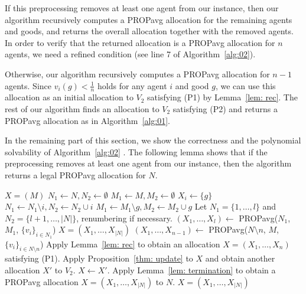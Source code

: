 \documentclass[11pt]{article}
\newcommand{\PROPavg}{\textsf{PROPavg}\xspace}
\begin{document}
If this preprocessing removes at least one agent from our instance, then our algorithm recursively computes a \PROPavg allocation for the remaining agents and goods, and returns the overall allocation together with the removed agents.
In order to verify that the returned allocation is a \PROPavg allocation for $n$ agents, we need a refined condition (see line 7 of Algorithm~\ref{alg:02}).

Otherwise, our algorithm recursively computes a \PROPavg allocation for $n-1$ agents.
Since $v_i(g)< \frac{1}{n}$ holds for any agent $i$ and good $g$,  
we can use this allocation as an initial allocation to $V_2$ satisfying (P1) by Lemma~\ref{lem: rec}.
The rest of our algorithm finds an allocation to $V_2$ satisfying (P2) and returns a \PROPavg allocation as in Algorithm~\ref{alg:01}.

In the remaining part of this section, we show the correctness and the polynomial solvability of Algorithm~\ref{alg:02} .
The following lemma shows that if the preprocessing removes at least one agent from our instance, then the algorithm returns a legal \PROPavg allocation for $N$.
\begin{algorithm}[htb]
\caption{ Algorithm for finding a \PROPavg allocation in polynomial time}
\label{alg:02}
\begin{algorithmic}[1]
\State \Return $X=(M)$
\Else
\State $N_1 \leftarrow N, N_2 \leftarrow \emptyset$
\State $M_1 \leftarrow M, M_2 \leftarrow \emptyset$
\State $X_i \leftarrow \{g\}$
\State $N_1\leftarrow N_1\setminus i, N_2 \leftarrow N_2\cup i$
\State $M_1\leftarrow M_1\setminus g, M_2 \leftarrow M_2\cup g$
\EndWhile
\State Let $N_1=\{1,\ldots, l\}$ and $N_2=\{l+1,\ldots, |N|\}$, renumbering if necessary.
\State $(X_1,\ldots, X_l) \leftarrow$ { \sc PROPavg}($N_1$, $M_1$, $\{v_i\}_{i \in N_1}$)
\State \Return $X=(X_1,\ldots, X_{|N|})$
\Else
\State $(X_1,\ldots, X_{n-1}) \leftarrow$ { \sc PROPavg}($N\setminus n$, $M$, $\{v_i\}_{i \in N\setminus n}$)
\State Apply Lemma~\ref{lem: rec} to obtain an allocation $X=(X_1,\ldots, X_{n})$ satisfying (P1). 
    \State Apply Proposition~\ref{thm: update} to $X$ and obtain another allocation $X'$ to $V_2$. 
    \State $X \leftarrow X'$.
\EndWhile
\State Apply Lemma~\ref{lem: termination} to obtain a \PROPavg allocation $X=(X_1,\ldots, X_{|N|})$ to $N$.
\State \Return $X=(X_1,\ldots, X_{|N|})$
\EndIf
\EndIf
\EndProcedure
\end{algorithmic}
\end{algorithm}
\end{document}
